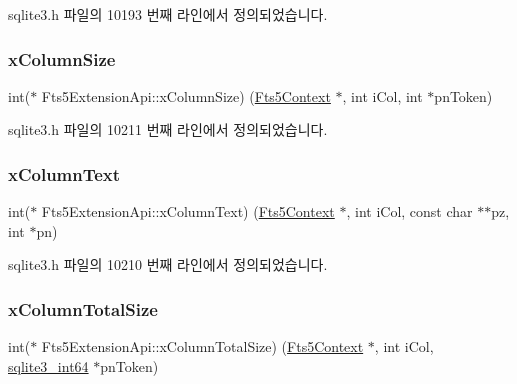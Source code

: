 sqlite3.\+h 파일의 10193 번째 라인에서 정의되었습니다.

\mbox{\label{struct_fts5_extension_api_aefe6eb4685546e58f056a61da39a2bcb}} 
\subsubsection{\texorpdfstring{x\+Column\+Size}{xColumnSize}}
{\footnotesize\ttfamily int($\ast$ Fts5\+Extension\+Api\+::x\+Column\+Size) (\hyperlink{sqlite3_8h_a97821b95ebebd43db901977ffd5b26bc}{Fts5\+Context} $\ast$, int i\+Col, int $\ast$pn\+Token)}



sqlite3.\+h 파일의 10211 번째 라인에서 정의되었습니다.

\mbox{\label{struct_fts5_extension_api_a03c7fcd31a751fc34d25e5288045f91d}} 
\subsubsection{\texorpdfstring{x\+Column\+Text}{xColumnText}}
{\footnotesize\ttfamily int($\ast$ Fts5\+Extension\+Api\+::x\+Column\+Text) (\hyperlink{sqlite3_8h_a97821b95ebebd43db901977ffd5b26bc}{Fts5\+Context} $\ast$, int i\+Col, const char $\ast$$\ast$pz, int $\ast$pn)}



sqlite3.\+h 파일의 10210 번째 라인에서 정의되었습니다.

\mbox{\label{struct_fts5_extension_api_a096e79406ae03df9796a2082d0ac8269}} 
\subsubsection{\texorpdfstring{x\+Column\+Total\+Size}{xColumnTotalSize}}
{\footnotesize\ttfamily int($\ast$ Fts5\+Extension\+Api\+::x\+Column\+Total\+Size) (\hyperlink{sqlite3_8h_a97821b95ebebd43db901977ffd5b26bc}{Fts5\+Context} $\ast$, int i\+Col, \hyperlink{sqlite3_8h_a0a4d3e6c1ad46f90e746b920ab6ca0d2}{sqlite3\+\_\+int64} $\ast$pn\+Token)}



